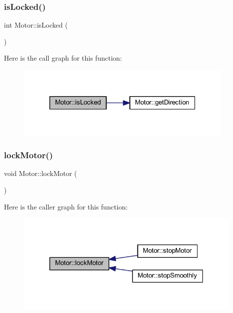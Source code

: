 \subsubsection{\texorpdfstring{is\+Locked()}{isLocked()}}
{\footnotesize\ttfamily int Motor\+::is\+Locked (\begin{DoxyParamCaption}{ }\end{DoxyParamCaption})}

Here is the call graph for this function\+:\nopagebreak
\begin{figure}[H]
\begin{center}
\leavevmode
\includegraphics[width=301pt]{class_motor_a7429cc5bd67dd69077008674eda80f2d_cgraph}
\end{center}
\end{figure}
\mbox{\label{class_motor_ad94e80f3e3918fa6aed53744f3339d0c}} 
\subsubsection{\texorpdfstring{lock\+Motor()}{lockMotor()}}
{\footnotesize\ttfamily void Motor\+::lock\+Motor (\begin{DoxyParamCaption}{ }\end{DoxyParamCaption})}

Here is the caller graph for this function\+:\nopagebreak
\begin{figure}[H]
\begin{center}
\leavevmode
\includegraphics[width=313pt]{class_motor_ad94e80f3e3918fa6aed53744f3339d0c_icgraph}
\end{center}
\end{figure}
\mbox{\label{class_motor_a81fada8275a8cd70805a9808314e7bee}} 
